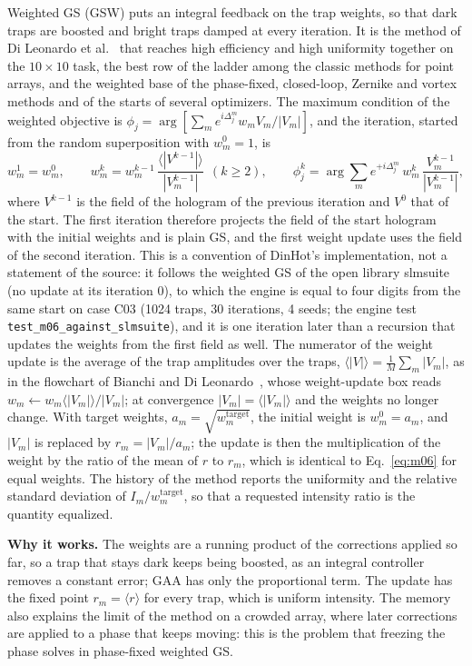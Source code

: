 Weighted GS (GSW) puts an integral feedback on the trap weights, so that dark traps are boosted and bright traps damped at every iteration. It is the method of Di Leonardo et al.~\cite{dileonardo} that reaches high efficiency and high uniformity together on the $10\times10$ task, the best row of the ladder among the classic methods for point arrays, and the weighted base of the phase-fixed, closed-loop, Zernike and vortex methods and of the starts of several optimizers. The maximum condition of the weighted objective is $\phi_j=\arg[\sum_m e^{i\Delta_j^m}w_mV_m/|V_m|]$, and the iteration, started from the random superposition with $w_m^0=1$, is
\begin{equation}
w_m^{1}=w_m^{0},\qquad w_m^{k}=w_m^{k-1}\,\frac{\langle|V^{k-1}|\rangle}{|V_m^{k-1}|}\ \ (k\ge2),\qquad
\phi_j^k=\arg\sum_m e^{+i\Delta_j^m}\,w_m^k\,\frac{V_m^{k-1}}{|V_m^{k-1}|},
\label{eq:m06}
\end{equation}
where $V^{k-1}$ is the field of the hologram of the previous iteration and $V^0$ that of the start. The first iteration therefore projects the field of the start hologram with the initial weights and is plain GS, and the first weight update uses the field of the second iteration. This is a convention of DinHot's implementation, not a statement of the source: it follows the weighted GS of the open library slmsuite (no update at its iteration 0), to which the engine is equal to four digits from the same start on case C03 (1024 traps, 30 iterations, 4 seeds; the engine test \texttt{test\_m06\_against\_slmsuite}), and it is one iteration later than a recursion that updates the weights from the first field as well.
The numerator of the weight update is the average of the trap amplitudes over the traps, $\langle|V|\rangle=\frac1M\sum_m|V_m|$, as in the flowchart of Bianchi and Di Leonardo~\cite{bianchi2010}, whose weight-update box reads $w_m\leftarrow w_m\langle|V_m|\rangle/|V_m|$; at convergence $|V_m|=\langle|V_m|\rangle$ and the weights no longer change. With target weights, $a_m=\sqrt{w_m^{\mathrm{target}}}$, the initial weight is $w_m^0=a_m$, and $|V_m|$ is replaced by $r_m=|V_m|/a_m$; the update is then the multiplication of the weight by the ratio of the mean of $r$ to $r_m$, which is identical to Eq.~\eqref{eq:m06} for equal weights. The history of the method reports the uniformity and the relative standard deviation of $I_m/w_m^{\mathrm{target}}$, so that a requested intensity ratio is the quantity equalized.

\textbf{Why it works.} The weights are a running product of the corrections applied so far, so a trap that stays dark keeps being boosted, as an integral controller removes a constant error; GAA has only the proportional term. The update has the fixed point $r_m=\langle r\rangle$ for every trap, which is uniform intensity. The memory also explains the limit of the method on a crowded array, where later corrections are applied to a phase that keeps moving: this is the problem that freezing the phase solves in phase-fixed weighted GS.

